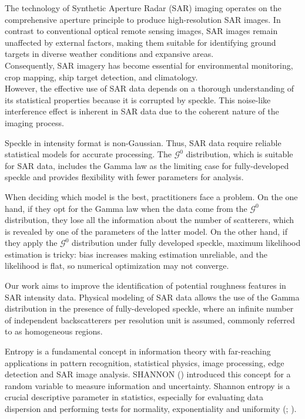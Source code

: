 \documentclass[
  letterpaper,
  11pt,
  english,
  doublespacing,
  headsepline,
  consistentlayout,
  oneside,
  openany]{MastersDoctoralThesis}
\begin{document}
The technology of Synthetic Aperture Radar (SAR) imaging operates on the
comprehensive aperture principle to produce high-resolution SAR images.
In contrast to conventional optical remote sensing images, SAR images
remain unaffected by external factors, making them suitable for
identifying ground targets in diverse weather conditions and expansive
areas.\\
Consequently, SAR imagery has become essential for environmental
monitoring, crop mapping, ship target detection, and climatology.\\
However, the effective use of SAR data depends on a thorough
understanding of its statistical properties because it is corrupted by
speckle. This noise-like interference effect is inherent in SAR data due
to the coherent nature of the imaging process.

Speckle in intensity format is non-Gaussian. Thus, SAR data require
reliable statistical models for accurate processing. The
\(\mathcal{G}^0\) distribution, which is suitable for SAR data, includes
the Gamma law as the limiting case for fully-developed speckle and
provides flexibility with fewer parameters for analysis.

When deciding which model is the best, practitioners face a problem. On
the one hand, if they opt for the Gamma law when the data come from the
\(\mathcal{G}^0\) distribution, they lose all the information about the
number of scatterers, which is revealed by one of the parameters of the
latter model. On the other hand, if they apply the \(\mathcal{G}^0\)
distribution under fully developed speckle, maximum likelihood
estimation is tricky: bias increases making estimation unreliable, and
the likelihood is flat, so numerical optimization may not converge.

Our work aims to improve the identification of potential roughness
features in SAR intensity data. Physical modeling of SAR data allows the
use of the Gamma distribution in the presence of fully-developed
speckle, where an infinite number of independent backscatterers per
resolution unit is assumed, commonly referred to as homogeneous regions.

Entropy is a fundamental concept in information theory with far-reaching
applications in pattern recognition, statistical physics, image
processing, edge detection and SAR image analysis. SHANNON
() introduced this concept for a random
variable to measure information and uncertainty. Shannon entropy is a
crucial descriptive parameter in statistics, especially for evaluating
data dispersion and performing tests for normality, exponentiality and
uniformity (; ).
\end{document}
